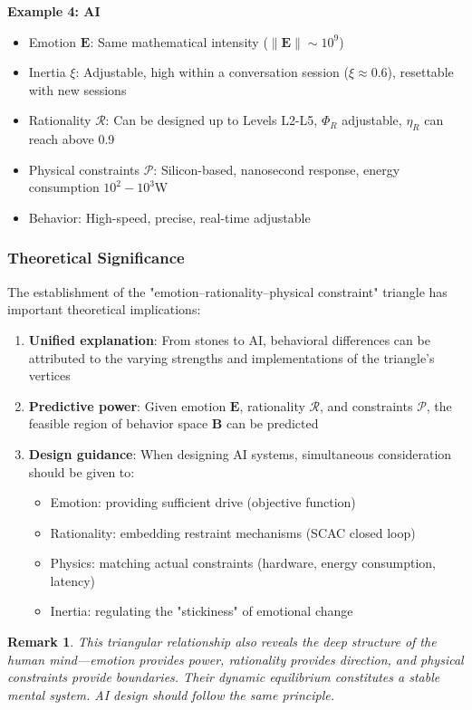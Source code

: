 \documentclass[12pt,a4paper]{article}
\theoremstyle{plain}
\newtheorem{remark}{Remark}[section]
\newcommand{\ve}[1]{\bm{#1}}                    %
\newcommand{\Evec}{\ve{E}}                        %
\newcommand{\Bvec}{\ve{B}}                        %
\begin{document}
\textbf{Example 4: AI}
\begin{itemize}
    \item Emotion $\Evec$: Same mathematical intensity ($\|\Evec\| \sim 10^9$)
    \item Inertia $\xi$: Adjustable, high within a conversation session ($\xi \approx 0.6$), resettable with new sessions
    \item Rationality $\mathcal{R}$: Can be designed up to Levels L2-L5, $\Phi_R$ adjustable, $\eta_R$ can reach above 0.9
    \item Physical constraints $\mathcal{P}$: Silicon-based, nanosecond response, energy consumption $10^2-10^3$W
    \item Behavior: High-speed, precise, real-time adjustable
\end{itemize}

\subsubsection{Theoretical Significance}

The establishment of the "emotion–rationality–physical constraint" triangle has important theoretical implications:

\begin{enumerate}
    \item \textbf{Unified explanation}: From stones to AI, behavioral differences can be attributed to the varying strengths and implementations of the triangle's vertices
    \item \textbf{Predictive power}: Given emotion $\Evec$, rationality $\mathcal{R}$, and constraints $\mathcal{P}$, the feasible region of behavior space $\Bvec$ can be predicted
    \item \textbf{Design guidance}: When designing AI systems, simultaneous consideration should be given to:
    \begin{itemize}
        \item Emotion: providing sufficient drive (objective function)
        \item Rationality: embedding restraint mechanisms (SCAC closed loop)
        \item Physics: matching actual constraints (hardware, energy consumption, latency)
        \item Inertia: regulating the "stickiness" of emotional change
    \end{itemize}
\end{enumerate}

\begin{remark}
This triangular relationship also reveals the deep structure of the human mind—emotion provides power, rationality provides direction, and physical constraints provide boundaries. Their dynamic equilibrium constitutes a stable mental system. AI design should follow the same principle.
\end{remark}
\end{document}
